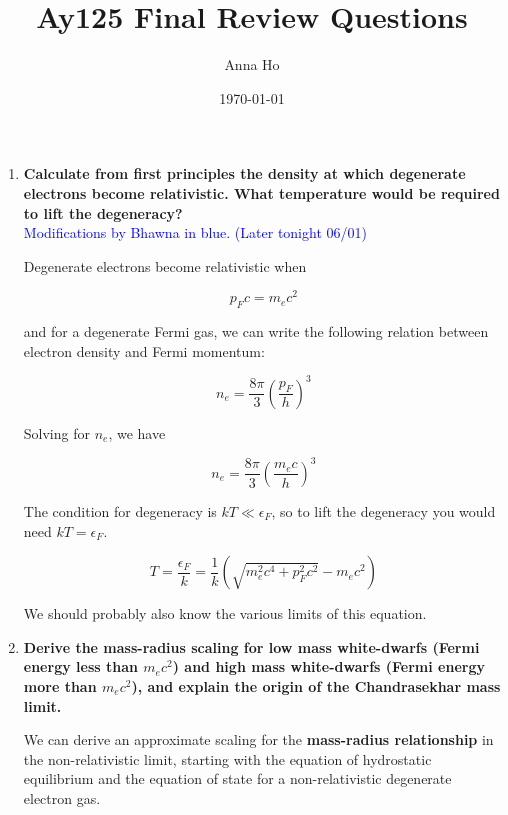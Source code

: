\documentclass[a4paper]{article}
\title{Ay125 Final Review Questions}
\author{Anna Ho}
\date{\today}
\begin{document}
\maketitle

\begin{enumerate}

\item \textbf{Calculate from first principles the density at which degenerate electrons become relativistic. What temperature would be required to lift the degeneracy?} \\

\textcolor{blue}{Modifications by Bhawna in blue. (Later tonight 06/01)}

Degenerate electrons become relativistic when 

\begin{equation}
p_F c = m_e c^2
\end{equation}

and for a degenerate Fermi gas, we can write the following relation between electron density and Fermi momentum:

\begin{equation}
n_e = \frac{8 \pi}{3} \left( \frac{p_F}{h} \right)^3
\end{equation}

Solving for $n_e$, we have

\begin{equation}
n_e = \frac{8 \pi}{3} \left( \frac{m_e c}{h} \right)^3
\end{equation}

The condition for degeneracy is $kT \ll \epsilon_F$, so to lift the degeneracy you would need $kT = \epsilon_F$. 

\begin{equation}
T = \frac{\epsilon_F}{k} = \frac{1}{k} \left( \sqrt{m_e^2 c^4 + p_F^2 c^2} - m_e c^2 \right)
\end{equation}

We should probably also know the various limits of this equation. \newline

\item \textbf{Derive the mass-radius scaling for low mass white-dwarfs (Fermi energy less than $m_e c^2$) and high mass white-dwarfs (Fermi energy more than $m_e c^2$), and explain the origin of the Chandrasekhar mass limit.} \newline

We can derive an approximate scaling for the \textbf{mass-radius relationship} in the non-relativistic limit, starting with the equation of hydrostatic equilibrium and the equation of state for a non-relativistic degenerate electron gas.


\end{enumerate}
\end{document}
